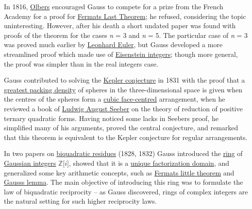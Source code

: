 In 1816, \href{https://en.wikipedia.org/wiki/Heinrich_Wilhelm_Matthias_Olbers}{Olbers} encouraged Gauss to compete for a prize from the French Academy for a proof for \href{https://en.wikipedia.org/wiki/Fermat's_Last_Theorem}{Fermat\textquotesingle s Last Theorem}; he refused, considering the topic uninteresting. However, after his death a short undated paper was found with proofs of the theorem for the cases \emph{n} = 3 and \emph{n} = 5. The particular case of \emph{n} = 3 was proved much earlier by \href{https://en.wikipedia.org/wiki/Leonhard_Euler}{Leonhard Euler}, but Gauss developed a more streamlined proof which made use of \href{https://en.wikipedia.org/wiki/Eisenstein_integers}{Eisenstein integers}; though more general, the proof was simpler than in the real integers case.

Gauss contributed to solving the \href{https://en.wikipedia.org/wiki/Kepler_conjecture}{Kepler conjecture} in 1831 with the proof that a \href{https://en.wikipedia.org/wiki/Close-packing_of_equal_spheres}{greatest packing density} of spheres in the three-dimensional space is given when the centres of the spheres form a \href{https://en.wikipedia.org/wiki/Cubic_crystal_system}{cubic face-centred} arrangement, when he reviewed a book of \href{https://en.wikipedia.org/wiki/Ludwig_August_Seeber}{Ludwig August Seeber} on the theory of reduction of positive ternary quadratic forms. Having noticed some lacks in Seeber\textquotesingle s proof, he simplified many of his arguments, proved the central conjecture, and remarked that this theorem is equivalent to the Kepler conjecture for regular arrangements.

In two papers on \href{https://en.wikipedia.org/wiki/Quartic_reciprocity}{biquadratic residues} (1828, 1832) Gauss introduced the \href{https://en.wikipedia.org/wiki/Ring_theory}{ring} of \href{https://en.wikipedia.org/wiki/Gaussian_integers}{Gaussian integers} {{\(\mathbb{Z}\lbrack i\rbrack\)}{}}, showed that it is a \href{https://en.wikipedia.org/wiki/Unique_factorization_domain}{unique factorization domain}, and generalized some key arithmetic concepts, such as \href{https://en.wikipedia.org/wiki/Fermat's_little_theorem}{Fermat\textquotesingle s little theorem} and \href{https://en.wikipedia.org/wiki/Gauss's_lemma_(number_theory)}{Gauss\textquotesingle s lemma}. The main objective of introducing this ring was to formulate the law of biquadratic reciprocity -- as Gauss discovered, rings of complex integers are the natural setting for such higher reciprocity laws.

